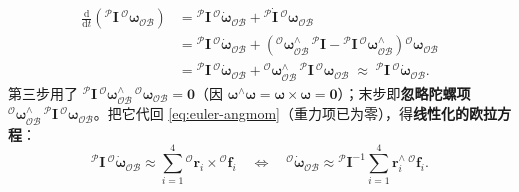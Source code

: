 \begin{equation}
\begin{aligned}
  \frac{\mathrm{d}}{\mathrm{d}t}\!\left({}^{\mathcal{P}}\mathbf{I}\,{}^{\mathcal{O}}\boldsymbol{\omega}_{\mathcal{OB}}\right)
  &={}^{\mathcal{P}}\mathbf{I}\,{}^{\mathcal{O}}\dot{\boldsymbol{\omega}}_{\mathcal{OB}}+{}^{\mathcal{P}}\dot{\mathbf{I}}\,{}^{\mathcal{O}}\boldsymbol{\omega}_{\mathcal{OB}}\\
  &={}^{\mathcal{P}}\mathbf{I}\,{}^{\mathcal{O}}\dot{\boldsymbol{\omega}}_{\mathcal{OB}}
  +\left({}^{\mathcal{O}}\boldsymbol{\omega}_{\mathcal{OB}}^{\wedge}\,{}^{\mathcal{P}}\mathbf{I}-{}^{\mathcal{P}}\mathbf{I}\,{}^{\mathcal{O}}\boldsymbol{\omega}_{\mathcal{OB}}^{\wedge}\right){}^{\mathcal{O}}\boldsymbol{\omega}_{\mathcal{OB}}\\
  &={}^{\mathcal{P}}\mathbf{I}\,{}^{\mathcal{O}}\dot{\boldsymbol{\omega}}_{\mathcal{OB}}
  +{}^{\mathcal{O}}\boldsymbol{\omega}_{\mathcal{OB}}^{\wedge}\,{}^{\mathcal{P}}\mathbf{I}\,{}^{\mathcal{O}}\boldsymbol{\omega}_{\mathcal{OB}}
  \;\approx\;{}^{\mathcal{P}}\mathbf{I}\,{}^{\mathcal{O}}\dot{\boldsymbol{\omega}}_{\mathcal{OB}}.
\end{aligned}
\label{eq:angmom-dot}
\end{equation}
第三步用了 ${}^{\mathcal{P}}\mathbf{I}\,{}^{\mathcal{O}}\boldsymbol{\omega}_{\mathcal{OB}}^{\wedge}\,{}^{\mathcal{O}}\boldsymbol{\omega}_{\mathcal{OB}}=\mathbf{0}$（因 $\boldsymbol{\omega}^\wedge\boldsymbol{\omega}=\boldsymbol{\omega}\times\boldsymbol{\omega}=\mathbf{0}$）；末步即\textbf{忽略陀螺项} ${}^{\mathcal{O}}\boldsymbol{\omega}_{\mathcal{OB}}^{\wedge}\,{}^{\mathcal{P}}\mathbf{I}\,{}^{\mathcal{O}}\boldsymbol{\omega}_{\mathcal{OB}}$。把它代回 \cref{eq:euler-angmom}（重力项已为零），得\textbf{线性化的欧拉方程}：
\begin{equation}
  {}^{\mathcal{P}}\mathbf{I}\,{}^{\mathcal{O}}\dot{\boldsymbol{\omega}}_{\mathcal{OB}}\approx\sum_{i=1}^{4}{}^{\mathcal{O}}\boldsymbol{r}_i\times{}^{\mathcal{O}}\boldsymbol{f}_i
  \quad\Longleftrightarrow\quad
  {}^{\mathcal{O}}\dot{\boldsymbol{\omega}}_{\mathcal{OB}}\approx{}^{\mathcal{P}}\mathbf{I}^{-1}\sum_{i=1}^{4}\boldsymbol{r}_i^{\wedge}\,{}^{\mathcal{O}}\boldsymbol{f}_i.
  \label{eq:euler-linear}
\end{equation}

